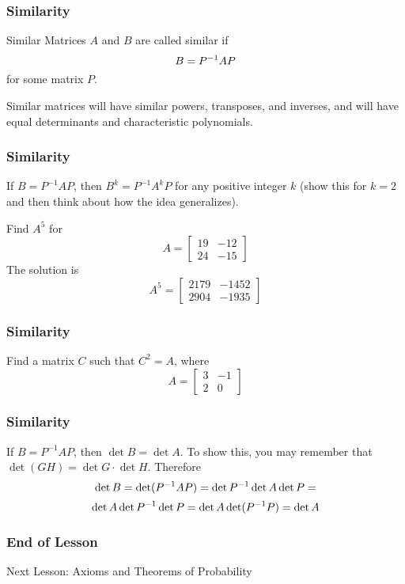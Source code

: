 \documentclass[xcolor=dvipsnames]{beamer}
\begin{document}
\begin{frame}
  \frametitle{Similarity}
  \begin{block}{Similar Matrices}
    $A$ and $B$ are called \alert{similar} if
    \begin{equation}
      \label{eq:aemiezef}
      B=P^{-1}AP\notag
    \end{equation}
    for some matrix $P$. 
  \end{block}

  \bigskip
  
Similar matrices will have similar powers, transposes, and inverses,
and will have equal determinants and characteristic polynomials.
\end{frame}

\begin{frame}
  \frametitle{Similarity}
  If $B=P^{-1}AP$, then $B^{k}=P^{-1}A^{k}P$ for any positive integer
  $k$ (show this for $k=2$ and then think about how the idea
  generalizes).

  \bigskip

  {\ubung} Find $A^{5}$ for
  \begin{equation}
    \label{eq:aisejiez}
    A=\left[
      \begin{array}{cc}
        19&-12 \\
        24&-15
      \end{array}\right]
  \end{equation}
  The solution is
  \begin{equation}
    \label{eq:pheishae}
    A^{5}=\left[
      \begin{array}{cc}
        2179&-1452 \\
        2904&-1935
      \end{array}\right]
  \end{equation}
\end{frame}

\begin{frame}
  \frametitle{Similarity}
  {\ubung} Find a matrix $C$ such that $C^{2}=A$, where
  \begin{equation}
    \label{eq:phaithee}
    A=\left[
      \begin{array}{cc}
        3&-1 \\
        2&0
      \end{array}\right]
  \end{equation}
\end{frame}

\begin{frame}
  \frametitle{Similarity}
  If $B=P^{-1}AP$, then $\det{}B=\det{}A$. To show this, you may
  remember that $\det{}(GH)=\det{}G\cdot\det{}H$. Therefore
  \begin{equation}
    \label{eq:taichahh}
    \det{}B=\det(P^{-1}AP)=\det{}P^{-1}\det{}A\det{}P=\notag
  \end{equation}
  \begin{equation}
    \label{eq:ielaemiy}
    \det{}A\det{}P^{-1}\det{}P=\det{}A\det(P^{-1}P)=\det{}A\notag
  \end{equation}
\end{frame}

\begin{frame}
  \frametitle{End of Lesson}
Next Lesson: Axioms and Theorems of Probability
\end{frame}
\end{document}
